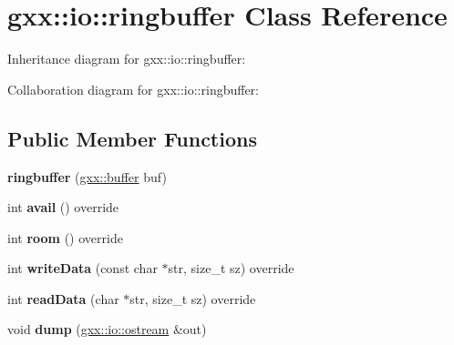 \hypertarget{classgxx_1_1io_1_1ringbuffer}{}\section{gxx\+:\+:io\+:\+:ringbuffer Class Reference}
\label{classgxx_1_1io_1_1ringbuffer}


Inheritance diagram for gxx\+:\+:io\+:\+:ringbuffer\+:


Collaboration diagram for gxx\+:\+:io\+:\+:ringbuffer\+:
\subsection*{Public Member Functions}
\begin{DoxyCompactItemize}
\item 
{\bfseries ringbuffer} (\hyperlink{classgxx_1_1buffer}{gxx\+::buffer} buf)\hypertarget{classgxx_1_1io_1_1ringbuffer_aa03b7396bf9c0819917584c868d70a91}{}\label{classgxx_1_1io_1_1ringbuffer_aa03b7396bf9c0819917584c868d70a91}

\item 
int {\bfseries avail} () override\hypertarget{classgxx_1_1io_1_1ringbuffer_aeca97dc05c5ddf80a32d28bd21ef52ad}{}\label{classgxx_1_1io_1_1ringbuffer_aeca97dc05c5ddf80a32d28bd21ef52ad}

\item 
int {\bfseries room} () override\hypertarget{classgxx_1_1io_1_1ringbuffer_a5abd4318791075f8586de9128191103b}{}\label{classgxx_1_1io_1_1ringbuffer_a5abd4318791075f8586de9128191103b}

\item 
int {\bfseries write\+Data} (const char $\ast$str, size\+\_\+t sz) override\hypertarget{classgxx_1_1io_1_1ringbuffer_a2263c6c3aa4625b86e3e32fa81060213}{}\label{classgxx_1_1io_1_1ringbuffer_a2263c6c3aa4625b86e3e32fa81060213}

\item 
int {\bfseries read\+Data} (char $\ast$str, size\+\_\+t sz) override\hypertarget{classgxx_1_1io_1_1ringbuffer_a0cdd70400a55181d2837bc0d45c26055}{}\label{classgxx_1_1io_1_1ringbuffer_a0cdd70400a55181d2837bc0d45c26055}

\item 
void {\bfseries dump} (\hyperlink{classgxx_1_1io_1_1ostream}{gxx\+::io\+::ostream} \&out)\hypertarget{classgxx_1_1io_1_1ringbuffer_a6d87fdd869f9330a803e482945fd6164}{}\label{classgxx_1_1io_1_1ringbuffer_a6d87fdd869f9330a803e482945fd6164}


\end{DoxyCompactItemize}
